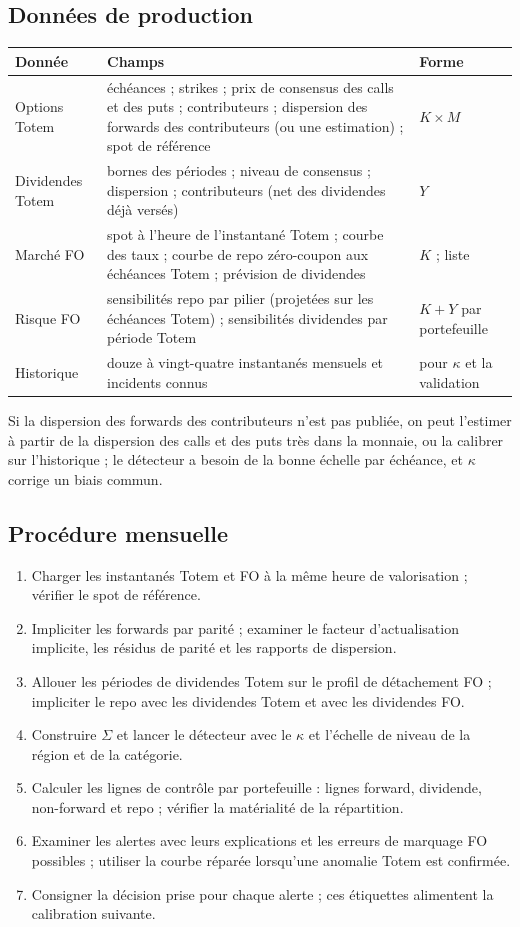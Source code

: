 \subsection{Données de production}
\begin{center}\small
\begin{tabular}{p{2.4cm}p{10.0cm}p{2.4cm}}
\toprule
Donnée & Champs & Forme\\
\midrule
Options Totem & échéances ; strikes ; prix de consensus des calls et des puts ; contributeurs ; dispersion des forwards des contributeurs (ou une estimation) ; spot de référence & $K\times M$\\
Dividendes Totem & bornes des périodes ; niveau de consensus ; dispersion ; contributeurs (net des dividendes déjà versés) & $Y$\\
Marché FO & spot à l'heure de l'instantané Totem ; courbe des taux ; courbe de repo zéro-coupon aux échéances Totem ; prévision de dividendes & $K$ ; liste\\
Risque FO & sensibilités repo par pilier (projetées sur les échéances Totem) ; sensibilités dividendes par période Totem & $K+Y$ par portefeuille\\
Historique & douze à vingt-quatre instantanés mensuels et incidents connus & pour $\kappa$ et la validation\\
\bottomrule
\end{tabular}
\end{center}
Si la dispersion des forwards des contributeurs n'est pas publiée, on peut l'estimer à partir de la dispersion des calls et
des puts très dans la monnaie, ou la calibrer sur l'historique ; le détecteur a besoin de la bonne échelle par échéance, et
$\kappa$ corrige un biais commun.

\subsection{Procédure mensuelle}
\begin{enumerate}
\item Charger les instantanés Totem et FO à la même heure de valorisation ; vérifier le spot de référence.
\item Impliciter les forwards par parité ; examiner le facteur d'actualisation implicite, les résidus de parité et les
rapports de dispersion.
\item Allouer les périodes de dividendes Totem sur le profil de détachement FO ; impliciter le repo avec les dividendes
Totem et avec les dividendes FO.
\item Construire $\Sigma$ et lancer le détecteur avec le $\kappa$ et l'échelle de niveau de la région et de la catégorie.
\item Calculer les lignes de contrôle par portefeuille : lignes forward, dividende, non-forward et repo ; vérifier la
matérialité de la répartition.
\item Examiner les alertes avec leurs explications et les erreurs de marquage FO possibles ; utiliser la courbe réparée
lorsqu'une anomalie Totem est confirmée.
\item Consigner la décision prise pour chaque alerte ; ces étiquettes alimentent la calibration suivante.
\end{enumerate}

